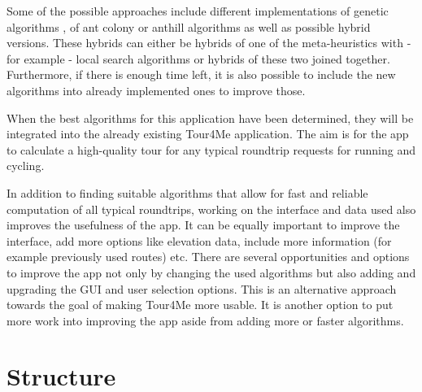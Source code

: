 Some of the possible approaches include different implementations of genetic algorithms \cite{gendreau_handbook_2010}, of ant colony or anthill algorithms \cite{gendreau_handbook_2010, babaoglu_anthill_2002, wang_application_2014} as well as possible hybrid versions.
These hybrids can either be hybrids of one of the meta-heuristics with - for example - local search algorithms \cite{gendreau_handbook_2010, wang_application_2014} or hybrids of these two joined together.
Furthermore, if there is enough time left, it is also possible to include the new algorithms into already implemented ones to improve those.

When the best algorithms for this application have been determined, they will be integrated into the already existing Tour4Me application. The aim is for the app to calculate a high-quality tour for any typical roundtrip requests for running and cycling.

In addition to finding suitable algorithms that allow for fast and reliable computation of all typical roundtrips, working on the interface and data used also improves the usefulness of the app.
It can be equally important to improve the interface, add more options like elevation data, include more information (for example previously used routes) etc. 
There are several opportunities and options to improve the app not only by changing the used algorithms but also adding and upgrading the GUI and user selection options.
This is an alternative approach towards the goal of making Tour4Me more usable.
It is another option to put more work into improving the app aside from adding more or faster algorithms.



\section{Structure}
\label{sec:structure}